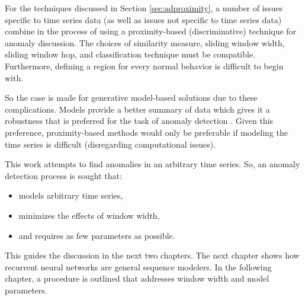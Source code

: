 For the techniques discussed in Section \ref{sec:adproximity}, a number of issues specific to time series data (as well as issues not specific to time series data) combine in the process of using a proximity-based (discriminative) technique for anomaly discussion. The choices of similarity measure, sliding window width, sliding window hop, and classification technique must be compatible. Furthermore, defining a region for every normal behavior is difficult to begin with.

So the case is made for generative model-based solutions due to these complications. Models provide a better summary of data which gives it a robustness that is preferred for the task of anomaly detection \cite{Ngkvist2014}. Given this preference, proximity-based methods would only be preferable if modeling the time series is difficult (disregarding computational issues).

This work attempts to find anomalies in an arbitrary time series. So, an anomaly detection process is sought that:
\begin{itemize}
\item models arbitrary time series,
\item minimizes the effects of window width,
\item and requires as few parameters as possible.
\end{itemize}

This guides the discussion in the next two chapters. The next chapter shows how recurrent neural networks are general sequence modelers. In the following chapter, a procedure is outlined that addresses window width and model parameters.



